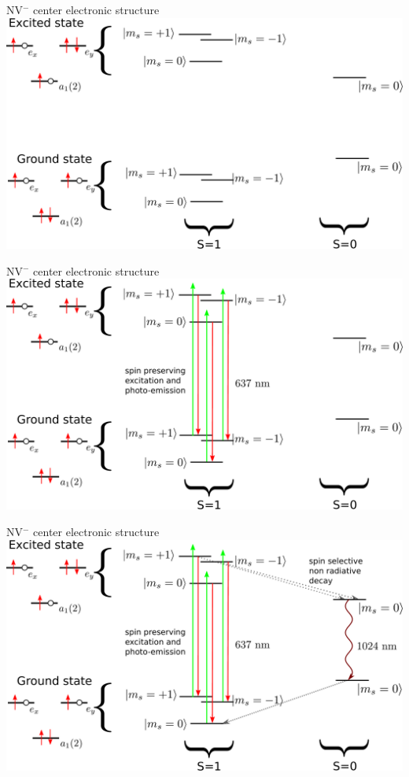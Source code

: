 \documentclass{beamer}
\begin{document}
\begin{frame}{NV$^-$ center electronic structure}
\centering
\includegraphics[width=\textwidth,height=0.9\textheight,keepaspectratio]{NV_8_niveaux_1}
\end{frame}
\begin{frame}{NV$^-$ center electronic structure}
\centering
\includegraphics[width=\textwidth,height=0.9\textheight,keepaspectratio]{NV_8_niveaux_2}
\end{frame}
\begin{frame}{NV$^-$ center electronic structure}
\centering
\includegraphics[width=\textwidth,height=0.9\textheight,keepaspectratio]{NV_8_niveaux_3}
\end{frame}
\end{document}
